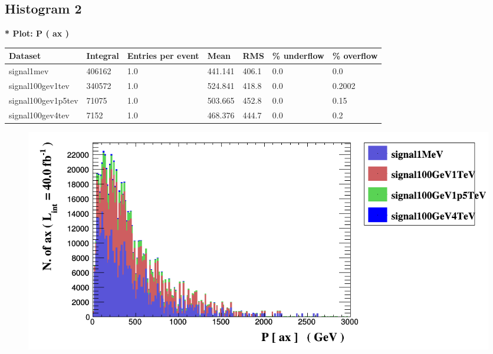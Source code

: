 \documentclass[a4paper, 10pt]{article}
\begin{document}
\subsection{ Histogram 2}

\textbf{* Plot: P ( ax ) }\\
   \begin{table}[H]
  \begin{center}
    \begin{tabular}{|m{23.0mm}|m{23.0mm}|m{18.0mm}|m{19.0mm}|m{19.0mm}|m{19.0mm}|m{19.0mm}|}
      \hline
      {\cellcolor{yellow}         Dataset}& {\cellcolor{yellow}         Integral}& {\cellcolor{yellow}         Entries per event}& {\cellcolor{yellow}         Mean}& {\cellcolor{yellow}         RMS}& {\cellcolor{yellow}         \% underflow}& {\cellcolor{yellow}         \% overflow}\\
      \hline
      {\cellcolor{white}         signal1mev}& {\cellcolor{white}         406162}& {\cellcolor{white}         1.0}& {\cellcolor{white}         441.141}& {\cellcolor{white}         406.1}& {\cellcolor{green}         0.0}& {\cellcolor{green}         0.0}\\
      \hline
      {\cellcolor{white}         signal100gev1tev}& {\cellcolor{white}         340572}& {\cellcolor{white}         1.0}& {\cellcolor{white}         524.841}& {\cellcolor{white}         418.8}& {\cellcolor{green}         0.0}& {\cellcolor{green}         0.2002}\\
      \hline
      {\cellcolor{white}         signal100gev1p5tev}& {\cellcolor{white}         71075}& {\cellcolor{white}         1.0}& {\cellcolor{white}         503.665}& {\cellcolor{white}         452.8}& {\cellcolor{green}         0.0}& {\cellcolor{green}         0.15}\\
      \hline
      {\cellcolor{white}         signal100gev4tev}& {\cellcolor{white}         7152}& {\cellcolor{white}         1.0}& {\cellcolor{white}         468.376}& {\cellcolor{white}         444.7}& {\cellcolor{green}         0.0}& {\cellcolor{green}         0.2}\\
\hline
    \end{tabular}
  \end{center}
\end{table}

\begin{figure}[H]
  \begin{center}
    \includegraphics[scale=0.45]{selection_1.png}\\
\caption{   }
  \end{center}
\end{figure}
      
\end{document}
